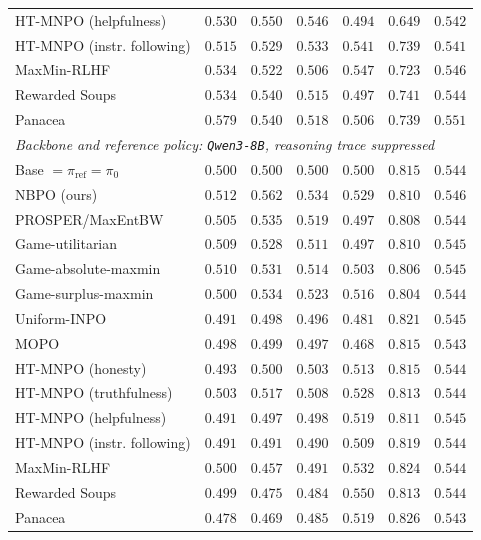 \documentclass{article}
\theoremstyle{remark}
\theoremstyle{plain}
\newcommand{\piref}{\pi_{\mathrm{ref}}}
\newcommand{\NBPO}{\textsc{NBPO}}
\begin{document}
\begin{table}[t]
\begin{tabular}{lrrrrrr}
HT-MNPO (helpfulness) & $0.530$ & $0.550$ & $0.546$ & $0.494$ & $0.649$ & $0.542$ \\
HT-MNPO (instr. following) & $0.515$ & $0.529$ & $0.533$ & $0.541$ & $0.739$ & $0.541$ \\
\addlinespace
MaxMin-RLHF & $0.534$ & $0.522$ & $0.506$ & $0.547$ & $0.723$ & $0.546$ \\
Rewarded Soups & $0.534$ & $0.540$ & $0.515$ & $0.497$ & $0.741$ & $0.544$ \\
Panacea & $0.579$ & $0.540$ & $0.518$ & $0.506$ & $0.739$ & $0.551$ \\
\midrule
\multicolumn{7}{l}{\textit{Backbone and reference policy: \texttt{Qwen3-8B}, reasoning trace suppressed}}\\
Base $=\piref=\pi_0$ & $0.500$ & $0.500$ & $0.500$ & $0.500$ & $0.815$ & $0.544$ \\
\NBPO{} (ours) & $\mathbf{0.512}$ & $\mathbf{0.562}$ & $\mathbf{0.534}$ & $\mathbf{0.529}$ & $0.810$ & $\mathbf{0.546}$ \\
PROSPER/MaxEntBW & $0.505$ & $0.535$ & $0.519$ & $0.497$ & $0.808$ & $0.544$ \\
Game-utilitarian & $0.509$ & $0.528$ & $0.511$ & $0.497$ & $0.810$ & $0.545$ \\
Game-absolute-maxmin & $0.510$ & $0.531$ & $0.514$ & $0.503$ & $0.806$ & $0.545$ \\
Game-surplus-maxmin & $0.500$ & $0.534$ & $0.523$ & $0.516$ & $0.804$ & $0.544$ \\
Uniform-INPO & $0.491$ & $0.498$ & $0.496$ & $0.481$ & $\mathbf{0.821}$ & $0.545$ \\
MOPO & $0.498$ & $0.499$ & $0.497$ & $0.468$ & $0.815$ & $0.543$ \\
HT-MNPO (honesty) & $0.493$ & $0.500$ & $0.503$ & $0.513$ & $0.815$ & $0.544$ \\
HT-MNPO (truthfulness) & $0.503$ & $0.517$ & $0.508$ & $0.528$ & $0.813$ & $0.544$ \\
HT-MNPO (helpfulness) & $0.491$ & $0.497$ & $0.498$ & $0.519$ & $0.811$ & $0.545$ \\
HT-MNPO (instr. following) & $0.491$ & $0.491$ & $0.490$ & $0.509$ & $0.819$ & $0.544$ \\
\addlinespace
MaxMin-RLHF & $0.500$ & $0.457$ & $0.491$ & $0.532$ & $0.824$ & $0.544$ \\
Rewarded Soups & $0.499$ & $0.475$ & $0.484$ & $0.550$ & $0.813$ & $0.544$ \\
Panacea & $0.478$ & $0.469$ & $0.485$ & $0.519$ & $0.826$ & $0.543$ \\
\bottomrule
\end{tabular}
\end{table}
\end{document}
